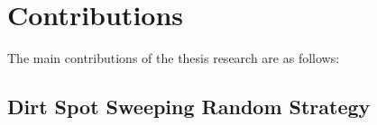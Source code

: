 




\section{Contributions}\label{contributions_1}
The main contributions of the thesis research are as follows: 

\subsection{Dirt Spot Sweeping Random Strategy}

